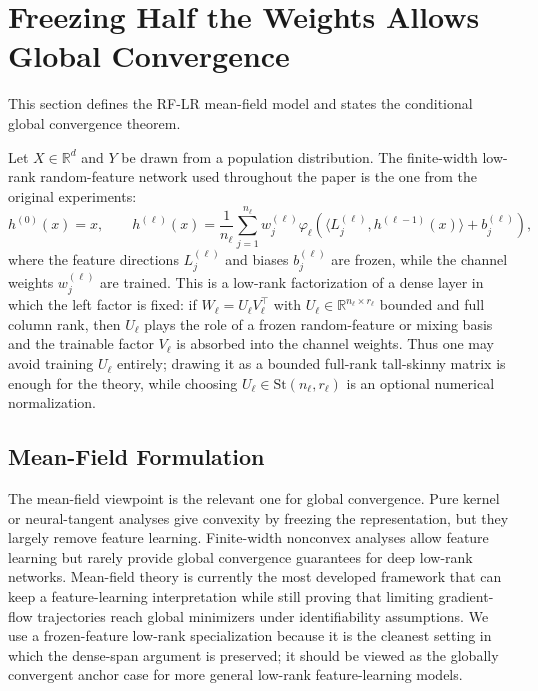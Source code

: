 \documentclass{article}
\newcommand{\R}{\mathbb{R}}
\begin{document}
\section{Freezing Half the Weights Allows Global Convergence}
\label{sec:model}

This section defines the RF-LR mean-field model and states the conditional global convergence theorem.

Let $X\in\R^d$ and $Y$ be drawn from a population distribution. The finite-width low-rank random-feature network used throughout the paper is the one from the original experiments:
\begin{equation}
h^{(0)}(x)=x,\qquad
h^{(\ell)}(x)=
\frac1{n_\ell}\sum_{j=1}^{n_\ell}
w_j^{(\ell)}
\varphi_\ell\!\left(
\langle L_j^{(\ell)},h^{(\ell-1)}(x)\rangle+b_j^{(\ell)}
\right),
\label{eq:finite-rflr}
\end{equation}
where the feature directions $L_j^{(\ell)}$ and biases $b_j^{(\ell)}$ are frozen, while the channel weights $w_j^{(\ell)}$ are trained. This is a low-rank factorization of a dense layer in which the left factor is fixed: if $W_\ell=U_\ell V_\ell^\top$ with $U_\ell\in\R^{n_\ell\times r_\ell}$ bounded and full column rank, then $U_\ell$ plays the role of a frozen random-feature or mixing basis and the trainable factor $V_\ell$ is absorbed into the channel weights. Thus one may avoid training $U_\ell$ entirely; drawing it as a bounded full-rank tall-skinny matrix is enough for the theory, while choosing $U_\ell\in\mathrm{St}(n_\ell,r_\ell)$ is an optional numerical normalization.

\subsection{Mean-Field Formulation}

The mean-field viewpoint is the relevant one for global convergence. Pure kernel or neural-tangent analyses give convexity by freezing the representation, but they largely remove feature learning. Finite-width nonconvex analyses allow feature learning but rarely provide global convergence guarantees for deep low-rank networks. Mean-field theory is currently the most developed framework that can keep a feature-learning interpretation while still proving that limiting gradient-flow trajectories reach global minimizers under identifiability assumptions. We use a frozen-feature low-rank specialization because it is the cleanest setting in which the dense-span argument is preserved; it should be viewed as the globally convergent anchor case for more general low-rank feature-learning models.
\end{document}
